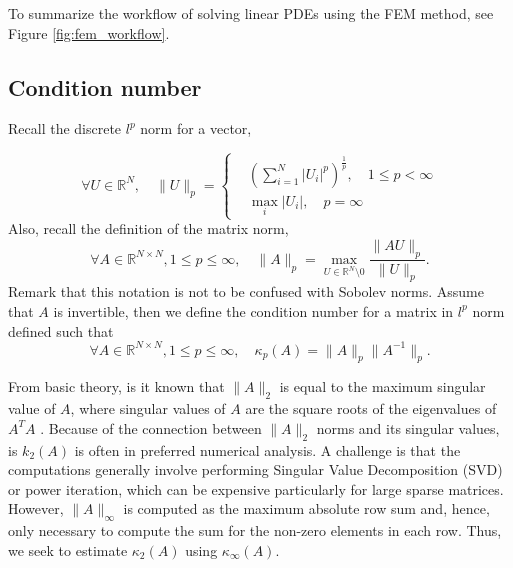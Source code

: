 \documentclass[11pt]{article}
\theoremstyle{remark}
\newcommand{\abs}[1]{\left\lvert #1 \right\rvert}
\renewcommand{\le}{\leqslant}
\numberwithin{equation}{section}
\begin{document}
To summarize the workflow of solving linear PDEs using the FEM method, see Figure \ref{fig:fem_workflow}.

\subsection{Condition number}%
\label{sub:note_on_condition_number}

Recall the discrete $l^{p}$ norm for a vector,

 \begin{equation}
     \forall U \in \mathbb{R} ^{N}, \quad
\| U  \|_{ p }^{  } =
     \begin{cases}
     &  \left( \sum_{i=1}^{N}  \abs{ U_{i}  }^{p} \right)^{\frac{1}{p}} , \quad  1\le p < \infty \\
   &  \max_{i}  \abs{ U_i },  \quad  p= \infty
     \end{cases}
 \end{equation}
Also, recall the definition of the matrix norm,
\begin{equation}
 \forall A \in \mathbb{R} ^{N\times N}, 1\le p \le  \infty, \quad  \| A  \|_{p  }^{  }  = \max_{U \in \mathbb{R} ^{N} \setminus 0} \frac{\| AU \|_{ p }^{  } }{\| U \|_{p}^{  } }.
\end{equation}
Remark that this notation is not to be confused with Sobolev norms.
Assume that $A $ is invertible, then we define the condition number for a matrix in $l^{p}  $ norm defined such that
\begin{equation}
    \label{eq:condition_num}
 \forall A \in \mathbb{R} ^{N\times N}, 1\le p \le  \infty, \quad  \kappa_{p} ( A) = \| A  \|_{ p }^{  } \| A ^{-1} \|_{ p }.
\end{equation}

From basic theory, is it known that $\| A \|_{ 2 }^{  } $   is equal to the maximum singular value of $A$, where singular values of $ A$  are the square roots of the eigenvalues of $A^TA$ \cite[Theorem 2.9]{ suli2003introduction}. Because of the connection
between $\| A \|_{ 2 }^{  } $ norms and its singular values, is $k_{2}( A) $ is often in preferred numerical analysis.
A challenge is that the computations generally involve performing Singular Value Decomposition (SVD)
 or power iteration, which can be  expensive particularly for large sparse matrices.
 However,  $\| A \|_{ \infty }^{  } $ is computed as the maximum absolute row sum and, hence, only necessary to compute the sum for the non-zero elements in each row. Thus, we seek to estimate
 $\kappa_{2}( A) $ using $ \kappa _{\infty}( A) $.
\end{document}
